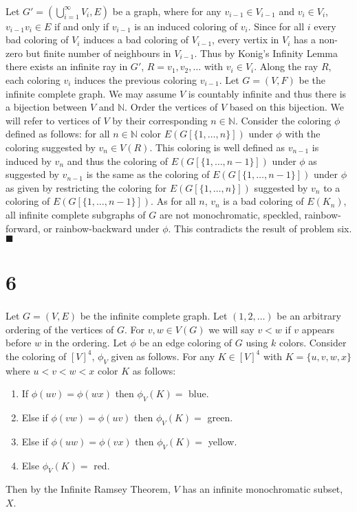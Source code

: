 \documentclass[letterpaper,12pt,oneside,onecolumn]{article}
\newcommand{\N}{\mathbb{N}} \newcommand{\R}{\mathbb{R}}
\begin{document}
\paragraph{}
Let $G' = (\bigcup_{i=1}^\infty V_i, E)$ be a graph, where for any $v_{i-1} \in V_{i-1}$ and $ v_i \in V_i$, $v_{i-1}v_i \in E$ if and only if $v_{i-1}$ is an induced coloring of $v_i$. Since for all $i$ every bad coloring of $V_i$ induces a bad coloring of $V_{i-1}$, every vertix in $V_i$ has a non-zero but finite number of neighbours in $V_{i-1}$. Thus by Konig's Infinity Lemma there exists an infinite ray in $G'$, $R=v_1,v_2,\dots$ with $v_i \in V_i$. Along the ray $R$, each coloring $v_i$ induces the previous coloring $v_{i-1}$. Let $G=(V,F)$ be the infinite complete graph. We may assume $V$ is countably infinite and thus there is a bijection between $V$ and $\N$. Order the vertices of $V$ based on this bijection. We will refer to vertices of $V$ by their corresponding $n \in \N$. Consider the coloring $\phi$ defined as follows: for all $n \in \N$ color $E(G[\{1,\dots,n\}])$ under $\phi$ with the coloring suggested by $v_n \in V(R)$. This coloring is well defined as $v_{n-1}$ is induced by $v_n$ and thus the coloring of $E(G[\{1,\dots,n-1\}])$ under $\phi$ as suggested by $v_{n-1}$ is the same as the coloring of $E(G[\{1,\dots,n-1\}])$ under $\phi$ as given by restricting the coloring for $E(G[\{1,\dots,n\}])$ suggested by $v_n$ to a coloring of $E(G[\{1,\dots, n-1\}])$. As for all $n$, $v_n$ is a bad coloring of $E(K_n)$, all infinite complete subgraphs of $G$ are not monochromatic, speckled, rainbow-forward, or rainbow-backward under $\phi$. This contradicts the result of problem six. $\blacksquare$
\section*{6}
\paragraph{}
Let $G=(V,E)$ be the infinite complete graph. Let $(1,2,\dots)$ be an arbitrary ordering of the vertices of $G$. For $v,w \in V(G)$ we will say $v < w$ if $v$ appears before $w$ in the ordering. Let $\phi$ be an edge coloring of $G$ using $k$ colors. Consider the coloring of $[V]^4$, $\phi_V$ given as follows. For any $K \in [V]^4$ with $K = \{u,v,w,x\}$ where $u<v<w<x$ color $K$ as follows:
\begin{enumerate}
\item If $\phi(uv) = \phi(wx)$ then $\phi_V(K)=$ blue.
\item Else if $\phi(vw)=\phi(uv)$ then $\phi_V(K)=$ green.
\item Else if $\phi(uw) = \phi(vx)$ then $\phi_V(K)=$ yellow.
\item Else $\phi_V(K)=$  red.
\end{enumerate}
Then by the Infinite Ramsey Theorem, $V$ has an infinite monochromatic subset, $X$.
\end{document}
